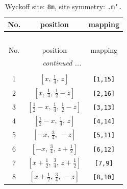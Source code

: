 \documentclass[fleqn,8pt]{jsarticle}
\begin{document}
\begin{longtable}{ccc}
\caption{Wyckoff site: {\tt 8m}, site symmetry: {\tt .m'.}}
 \\
 \hline \hline
No. & position & mapping \\ \hline \endfirsthead

\multicolumn{2}{l}{\tablename\ \thetable{}} \\
 \hline \hline
No. & position & mapping \\ \hline \endhead

 \hline \hline
\multicolumn{2}{r}{\footnotesize\it continued ...} \\ \endfoot

 \hline \hline
\multicolumn{2}{r}{} \\ \endlastfoot

1 & $\left[ x,\, \frac{1}{4},\, z \right]$ & {\tt [1,15]} \\ \hline
2 & $\left[ x,\, \frac{1}{4},\, \frac{1}{2} - z \right]$ & {\tt [2,16]} \\ \hline
3 & $\left[ \frac{1}{2} - x,\, \frac{1}{4},\, \frac{1}{2} - z \right]$ & {\tt [3,13]} \\ \hline
4 & $\left[ \frac{1}{2} - x,\, \frac{1}{4},\, z \right]$ & {\tt [4,14]} \\ \hline
5 & $\left[ - x,\, \frac{3}{4},\, - z \right]$ & {\tt [5,11]} \\ \hline
6 & $\left[ - x,\, \frac{3}{4},\, z + \frac{1}{2} \right]$ & {\tt [6,12]} \\ \hline
7 & $\left[ x + \frac{1}{2},\, \frac{3}{4},\, z + \frac{1}{2} \right]$ & {\tt [7,9]} \\ \hline
8 & $\left[ x + \frac{1}{2},\, \frac{3}{4},\, - z \right]$ & {\tt [8,10]} \\
\end{longtable}
\renewcommand{\arraystretch}{1.2}
\end{document}
